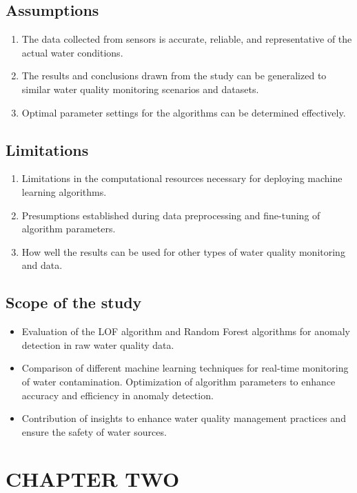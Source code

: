 \documentclass[12pt]{report}
\begin{document}
\subsection{Assumptions}
\begin{enumerate}
    \item The data collected from sensors is accurate, reliable, and representative of the actual water conditions.
\item  The results and conclusions drawn from the study can be generalized to similar water quality monitoring scenarios and datasets.
\item Optimal parameter settings for the algorithms can be determined effectively.
\end{enumerate}
\subsection{Limitations}
\begin{enumerate}
    \item Limitations in the computational resources necessary for deploying machine learning algorithms.
\item Presumptions established during data preprocessing and fine-tuning of algorithm parameters.
\item  How well the results can be used for other types of water quality monitoring and data.
\end{enumerate}

\subsection{Scope of the  study}
\begin{itemize}
    \item Evaluation of the LOF algorithm and Random Forest algorithms for anomaly detection in raw water quality data.
\item Comparison of different machine learning techniques for real-time monitoring of water contamination.
Optimization of algorithm parameters to enhance accuracy and efficiency in anomaly detection.
\item Contribution of insights to enhance water quality management practices and ensure the safety of water sources.
\end{itemize}

\clearpage

\section*{\centering CHAPTER TWO}
\end{document}
